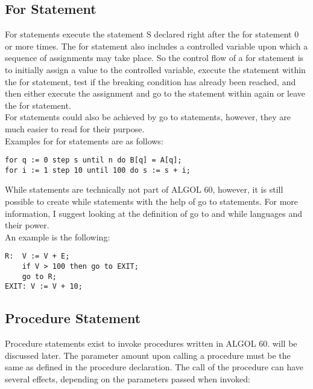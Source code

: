 \documentclass{article}
\begin{document}
\subsection{For Statement}
For statements execute the statement S declared right after the for statement 0 or more times. The for statement also includes a controlled variable upon which a sequence of assignments may take place. So the control flow of a for statement is to initially assign a value to the controlled variable, execute the statement within the for statement, test if the breaking condition has already been reached, and then either execute the assignment and go to the statement within again or leave the for statement.\\
For statements could also be achieved by go to statements, however, they are much easier to read for their purpose.\\

Examples for for statements are as follows:\\ 
\begin{lstlisting}[language={[60]algol}]
for q := 0 step s until n do B[q] = A[q];
for i := 1 step 10 until 100 do s := s + i;
\end{lstlisting}

While statements are technically not part of ALGOL 60, however, it is still possible to create while statements with the help of go to statements. For more information, I suggest looking at the definition of go to and while languages and their power.\\ 

An example is the following:\\

\begin{lstlisting}[language={[60]algol}]
R:  V := V + E;
    if V > 100 then go to EXIT;
    go to R;
EXIT: V := V + 10;
\end{lstlisting}


\subsection{Procedure Statement} \label{ProcStat}
Procedure statements exist to invoke procedures written in ALGOL 60.  will be discussed later. The parameter amount upon calling a procedure must be the same as defined in the procedure declaration. The call of the procedure can have several effects, depending on the parameters passed when invoked:
\end{document}
